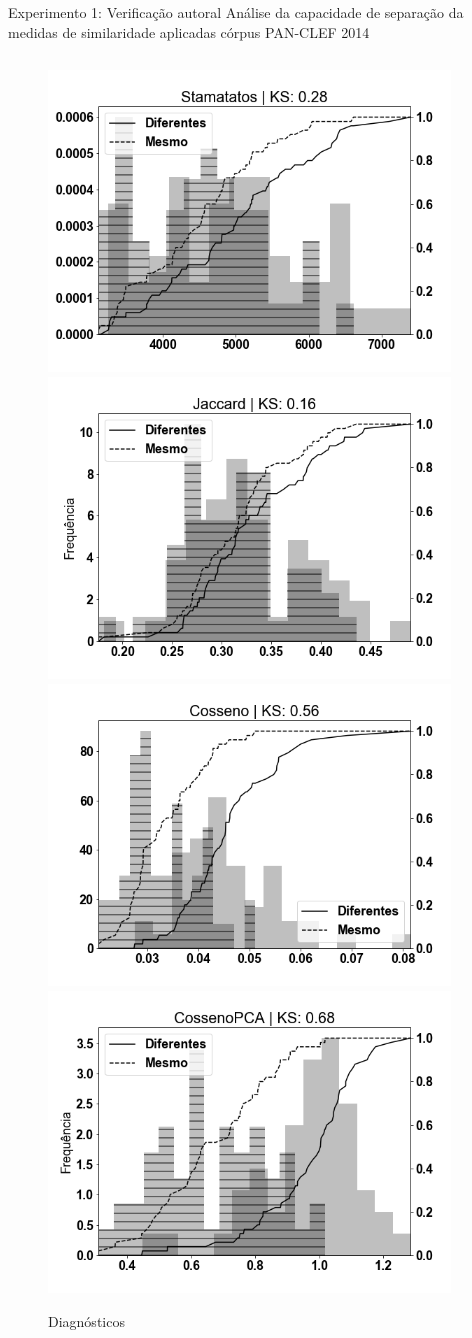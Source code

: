 \begin{frame}{Experimento 1: Verificação autoral}
Análise da capacidade de separação da medidas de similaridade aplicadas córpus PAN-CLEF 2014 \cite{aa-overview-2014}

\begin{columns}
\begin{column}{0.60\textwidth}
\begin{figure}[]\selectFont
	\centering
	\caption{\selectFont Diagnósticos}
	\includegraphics[width=.45\textwidth]{experimentoVerificacao/HDRIO_KS_spanish_Stamatatos.png} \vspace{0.3cm}
	\includegraphics[width=.45\textwidth]{experimentoVerificacao/HDRIO_KS_spanish_Jaccard.png} \vspace{0.3cm}
	\includegraphics[width=.45\textwidth]{experimentoVerificacao/HDRIO_KS_spanish_Cosseno.png}
	\includegraphics[width=.45\textwidth]{experimentoVerificacao/HDRIO_KS_spanish_CossenoPCA.png}
	\label{fig:exemplo}
\end{figure}
\end{column}
\begin{column}{0.37\textwidth}


\end{column}
\end{columns}
\end{frame}
